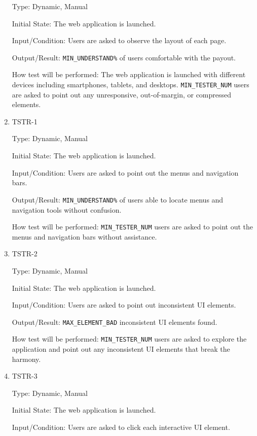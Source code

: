 \documentclass[12pt, titlepage]{article}
\begin{document}
\begin{enumerate}
Type: Dynamic, Manual
					
Initial State: The web application is launched.
					
Input/Condition: Users are asked to observe the layout of each page.
					
Output/Result: \texttt{MIN\_UNDERSTAND\%} of users comfortable with the payout.
					
How test will be performed: The web application is launched with different devices including smartphones, tablets, and desktops.  \texttt{MIN\_TESTER\_NUM} users are asked to point out any unresponsive, out-of-margin, or compressed elements.

\item{TSTR-1\\}\label{TSTR-1}

Type: Dynamic, Manual
					
Initial State: The web application is launched.
					
Input/Condition: Users are asked to point out the menus and navigation bars.
					
Output/Result: \texttt{MIN\_UNDERSTAND\%} of users able to locate menus and navigation tools without confusion.
					
How test will be performed: \texttt{MIN\_TESTER\_NUM} users are asked to point out the menus and navigation bars without assistance.

\item{TSTR-2\\}\label{TSTR-2}

Type: Dynamic, Manual
					
Initial State: The web application is launched.
					
Input/Condition: Users are asked to point out inconsistent UI elements.
					
Output/Result: \texttt{MAX\_ELEMENT\_BAD} inconsistent UI elements found.
					
How test will be performed: \texttt{MIN\_TESTER\_NUM} users are asked to explore the application and point out any inconsistent UI elements that break the harmony.

\item{TSTR-3\\}\label{TSTR-3}

Type: Dynamic, Manual
					
Initial State: The web application is launched.
					
Input/Condition: Users are asked to click each interactive UI element.
					

\end{enumerate}
\end{document}

